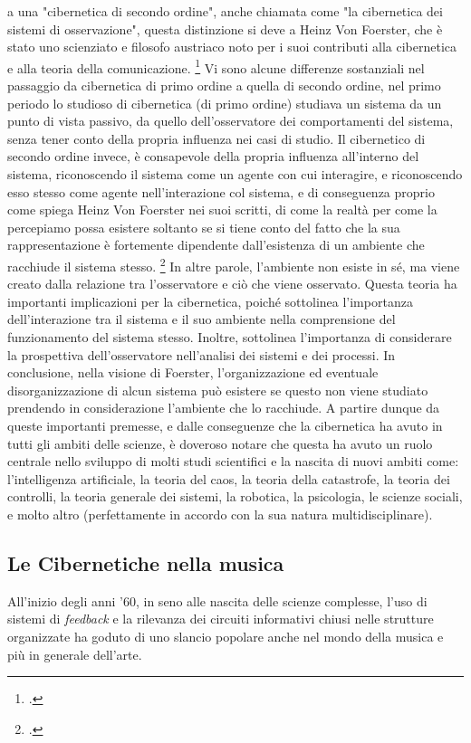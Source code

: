 a una "cibernetica di secondo ordine", anche chiamata come "la cibernetica dei sistemi di osservazione",
questa distinzione si deve a Heinz Von Foerster, 
che è stato uno scienziato e filosofo austriaco noto per i suoi contributi 
alla cibernetica e alla teoria della comunicazione. \footcite{scottsecondordercyb}
Vi sono alcune differenze sostanziali nel passaggio da cibernetica di primo ordine a quella di secondo ordine, 
nel primo periodo lo studioso di cibernetica (di primo ordine)
studiava un sistema da un punto di vista passivo, da quello dell'osservatore
dei comportamenti del sistema, senza tener conto della propria influenza 
nei casi di studio.
Il cibernetico di secondo ordine invece, è consapevole della propria 
influenza all'interno del sistema, riconoscendo il sistema come un agente con cui interagire, 
e riconoscendo esso stesso come agente nell'interazione col sistema, 
e di conseguenza proprio come spiega Heinz Von Foerster nei suoi scritti,
di come la realtà per come la percepiamo possa esistere
soltanto se si tiene conto del fatto che la sua rappresentazione è fortemente dipendente 
dall'esistenza di un ambiente che racchiude il sistema stesso. \footcite{understandingunderstanding}
In altre parole, l'ambiente non esiste in sé, ma viene creato dalla relazione 
tra l'osservatore e ciò che viene osservato.
Questa teoria ha importanti implicazioni per la cibernetica, 
poiché sottolinea l'importanza dell'interazione tra il sistema e il suo ambiente 
nella comprensione del funzionamento del sistema stesso. 
Inoltre, sottolinea l'importanza di considerare la prospettiva 
dell'osservatore nell'analisi dei sistemi e dei processi.
In conclusione, nella visione di Foerster, 
l'organizzazione ed eventuale disorganizzazione di alcun sistema può esistere 
se questo non viene studiato prendendo in considerazione l'ambiente che lo racchiude.
A partire dunque da queste importanti premesse, e dalle conseguenze 
che la cibernetica ha avuto in tutti gli ambiti delle scienze, è doveroso 
notare che questa ha avuto un ruolo centrale nello sviluppo di
molti studi scientifici e la nascita
di nuovi ambiti come: l'intelligenza artificiale, la teoria del caos,
la teoria della catastrofe,
la teoria dei controlli, la teoria generale dei sistemi, la robotica,
la psicologia, le scienze sociali, e molto altro 
(perfettamente in accordo con la sua natura multidisciplinare).

\subsection{Le Cibernetiche nella musica}
\label{sec:Le cibernetiche nella musica}
All'inizio degli anni '60, in seno alle nascita delle scienze complesse,
l'uso di sistemi di \emph{feedback}  e la rilevanza dei circuiti informativi chiusi
nelle strutture organizzate
ha goduto di uno slancio popolare anche nel mondo della musica
e più in generale dell'arte. 

